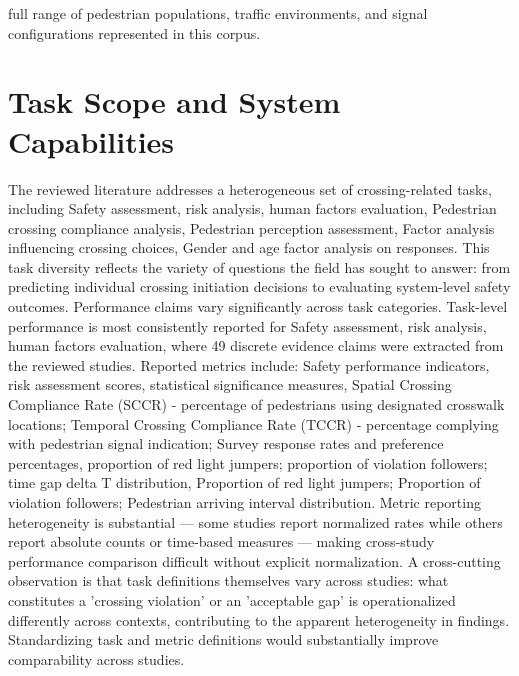 \documentclass{article}
\begin{document}
full range of pedestrian populations, traffic environments, and signal configurations represented in this corpus.

\section{Task Scope and System Capabilities}
The reviewed literature addresses a heterogeneous set of crossing-related tasks, including Safety assessment, risk analysis, human factors evaluation, Pedestrian crossing compliance analysis, Pedestrian perception assessment, Factor analysis influencing crossing choices, Gender and age factor analysis on responses. This task diversity reflects the variety of questions the field has sought to answer: from predicting individual crossing initiation decisions to evaluating system-level safety outcomes. Performance claims vary significantly across task categories. Task-level performance is most consistently reported for Safety assessment, risk analysis, human factors evaluation, where 49 discrete evidence claims were extracted from the reviewed studies. Reported metrics include: Safety performance indicators, risk assessment scores, statistical significance measures, Spatial Crossing Compliance Rate (SCCR) - percentage of pedestrians using designated crosswalk locations; Temporal Crossing Compliance Rate (TCCR) - percentage complying with pedestrian signal indication; Survey response rates and preference percentages, proportion of red light jumpers; proportion of violation followers; time gap delta T distribution, Proportion of red light jumpers; Proportion of violation followers; Pedestrian arriving interval distribution. Metric reporting heterogeneity is substantial — some studies report normalized rates while others report absolute counts or time-based measures — making cross-study performance comparison difficult without explicit normalization. A cross-cutting observation is that task definitions themselves vary across studies: what constitutes a 'crossing violation' or an 'acceptable gap' is operationalized differently across contexts, contributing to the apparent heterogeneity in findings. Standardizing task and metric definitions would substantially improve comparability across studies.
\end{document}
